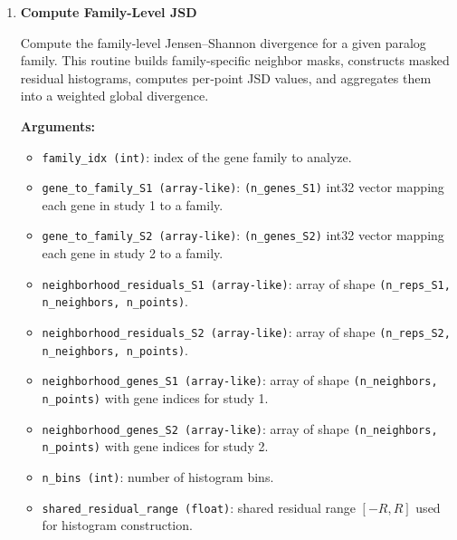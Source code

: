 \begin{enumerate}
        \textbf{Returns:}
        \begin{itemize}
            \item \lstinline!dict!: \{
                \lstinline!'jsd_null': np.ndarray (n_permutations,)!,  
                \lstinline!'p_value': float!
            \}
        \end{itemize}

        \begin{lstlisting}[language=Python, caption={Filtered Permutation Test for Global JSD}]
out = gjct_permutation_test_filtered(
    neighborhood_residuals_S1,
    neighborhood_residuals_S2,
    global_jsd_observed,
    n_bins,
    shared_residual_range,
    n_permutations,
    neighbor_mask_S1,
    neighbor_mask_S2,
    random_seed=42
)

jsd_null = out["jsd_null"]
p_value = out["p_value"]
        \end{lstlisting}

    \item \textbf{Compute Family-Level JSD}

        Compute the family-level Jensen–Shannon divergence for a given paralog family.  
        This routine builds family-specific neighbor masks, constructs masked residual histograms, computes per‑point JSD values, and aggregates them into a weighted global divergence.

        \textbf{Arguments:}
        \begin{itemize}
            \item \lstinline!family_idx (int)!: index of the gene family to analyze.
            \item \lstinline!gene_to_family_S1 (array-like)!: \lstinline!(n_genes_S1)! int32 vector mapping each gene in study 1 to a family.
            \item \lstinline!gene_to_family_S2 (array-like)!: \lstinline!(n_genes_S2)! int32 vector mapping each gene in study 2 to a family.
            \item \lstinline!neighborhood_residuals_S1 (array-like)!: array of shape \lstinline!(n_reps_S1, n_neighbors, n_points)!.
            \item \lstinline!neighborhood_residuals_S2 (array-like)!: array of shape \lstinline!(n_reps_S2, n_neighbors, n_points)!.
            \item \lstinline!neighborhood_genes_S1 (array-like)!: array of shape \lstinline!(n_neighbors, n_points)! with gene indices for study 1.
            \item \lstinline!neighborhood_genes_S2 (array-like)!: array of shape \lstinline!(n_neighbors, n_points)! with gene indices for study 2.
            \item \lstinline!n_bins (int)!: number of histogram bins.
            \item \lstinline!shared_residual_range (float)!: shared residual range \([-R, R]\) used for histogram construction.
        \end{itemize}


\end{enumerate}
